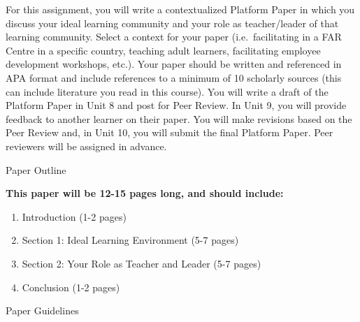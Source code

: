 \documentclass[
]{book}
\providecommand{\tightlist}{%
  \setlength{\itemsep}{0pt}\setlength{\parskip}{0pt}}
\begin{document}
\begin{assessment}
For this assignment, you will write a contextualized Platform Paper in
which you discuss your ideal learning community and your role as
teacher/leader of that learning community. Select a context for your
paper (i.e.~facilitating in a FAR Centre in a specific country, teaching
adult learners, facilitating employee development workshops, etc.). Your
paper should be written and referenced in APA format and include
references to a minimum of 10 scholarly sources (this can include
literature you read in this course). You will write a draft of the
Platform Paper in Unit 8 and post for Peer Review. In Unit 9, you will
provide feedback to another learner on their paper. You will make
revisions based on the Peer Review and, in Unit 10, you will submit the
final Platform Paper. Peer reviewers will be assigned in advance.

{Paper Outline}

\textbf{This paper will be 12-15 pages long, and should include:}

\begin{enumerate}
\def\labelenumi{\arabic{enumi}.}
\tightlist
\item
  Introduction (1-2 pages)\\
\item
  Section 1: Ideal Learning Environment (5-7 pages)\\
\item
  Section 2: Your Role as Teacher and Leader (5-7 pages)\\
\item
  Conclusion (1-2 pages)
\end{enumerate}

{Paper Guidelines}


\end{assessment}
\end{document}
